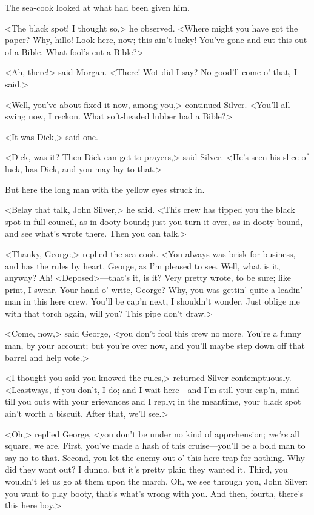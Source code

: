 The sea-cook looked at what had been given him.

<The black spot! I thought so,> he observed. <Where might you have got the paper? Why, hillo! Look here, now; this ain't lucky! You've gone and cut this out of a Bible. What fool's cut a Bible?>

<Ah, there!> said Morgan. <There! Wot did I say? No good'll come o' that, I said.>

<Well, you've about fixed it now, among you,> continued Silver. <You'll all swing now, I reckon. What soft-headed lubber had a Bible?>

<It was Dick,> said one.

<Dick, was it? Then Dick can get to prayers,> said Silver. <He's seen his slice of luck, has Dick, and you may lay to that.>

But here the long man with the yellow eyes struck in.

<Belay that talk, John Silver,> he said. <This crew has tipped you the black spot in full council, as in dooty bound; just you turn it over, as in dooty bound, and see what's wrote there. Then you can talk.>

<Thanky, George,> replied the sea-cook. <You always was brisk for business, and has the rules by heart, George, as I'm pleased to see. Well, what is it, anyway? Ah! <Deposed>—that's it, is it? Very pretty wrote, to be sure; like print, I swear. Your hand o' write, George? Why, you was gettin' quite a leadin' man in this here crew. You'll be cap'n next, I shouldn't wonder. Just oblige me with that torch again, will you? This pipe don't draw.>

<Come, now,> said George, <you don't fool this crew no more. You're a funny man, by your account; but you're over now, and you'll maybe step down off that barrel and help vote.>

<I thought you said you knowed the rules,> returned Silver contemptuously. <Leastways, if you don't, I do; and I wait here—and I'm still your cap'n, mind—till you outs with your grievances and I reply; in the meantime, your black spot ain't worth a biscuit. After that, we'll see.>

<Oh,> replied George, <you don't be under no kind of apprehension; \textit{we're} all square, we are. First, you've made a hash of this cruise—you'll be a bold man to say no to that. Second, you let the enemy out o' this here trap for nothing. Why did they want out? I dunno, but it's pretty plain they wanted it. Third, you wouldn't let us go at them upon the march. Oh, we see through you, John Silver; you want to play booty, that's what's wrong with you. And then, fourth, there's this here boy.>

